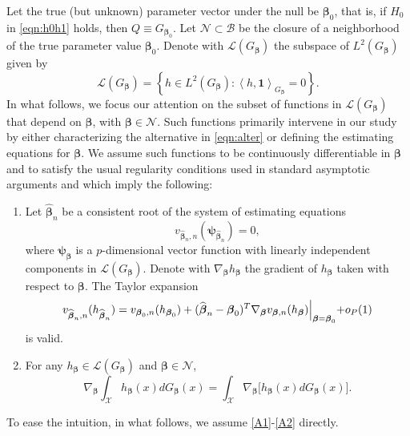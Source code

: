\documentclass[11pt]{article}
\newcommand{\vect}[1]{\boldsymbol{#1}}
\newcommand{\inner}[1]{\left\langle #1 \right\rangle}
\begin{document}
Let the true (but unknown) parameter vector under the null be $\vect{\beta}_0$, that is, if
$H_0$ in \eqref{eqn:h0h1} holds, then $Q\equiv G_{\vect{\beta}_0}$. Let $\mathcal{N}\subset\mathcal{B}$ be the closure of a neighborhood of the true parameter value $\vect{\beta}_0$.  Denote with $\mathcal{L}\left(G_{\vect{\beta}}\right)$ the subspace of $L^2\left(G_{\vect{\beta}}\right)$ given by
$$\mathcal{L}\left(G_{\vect{\beta}}\right)=\left\{ h \in L^2\left(G_{\vect{\beta}}\right): \inner{h,\bm{1}}_{G_{\vect{\beta}}}=0\right\}.$$ 
In what follows, we focus our attention on the subset of functions in $\mathcal{L}\left(G_{\vect{\beta}}\right)$ that depend on $\vect{\beta}$, with $\vect{\beta}\in\mathcal{N}$. Such functions primarily intervene in our study by either characterizing the alternative in \eqref{eqn:alter} or defining the estimating equations for $\vect{\beta}$. 
We assume such functions to be continuously differentiable in $\vect{\beta}$ and to satisfy the usual regularity conditions used in standard asymptotic arguments \citep[cf.][Ch.5]{van2000asymptotic} and which imply the following:
\begin{enumerate} [label=(A\arabic*)]
\item \label{A1} Let $\widehat{\vect{\beta}}_n$ be a consistent root of the system of estimating equations
 \begin{equation}
 \label{ref:estimation}
 v_{\widehat{\vect{\beta}}_n,n}( \vect{\psi}_{\widehat{\vect{\beta}}_n})=0,
 \end{equation}
where $\vect{\psi}_{\vect{\beta}}$ is a $p$-dimensional vector function with linearly independent components in $\mathcal{L}\left(G_{\vect{\beta}}\right)$. 
Denote with $\nabla_{\vect{\beta}}h_{\vect{\beta}}$ the gradient of  $h_{\vect{\beta}}$ taken with respect to $\vect{\beta}$. The Taylor expansion
\begin{equation}\label{eqn:Taylor}
v_{\widehat{\vect{\beta}}_n,n}(h_{\widehat{\vect{\beta}}_n}) = v_{\vect{\beta}_0,n}(h_{\vect{\beta}_0}) +  (\widehat{\vect{\beta}}_n- \vect{\beta}_0)^T \nabla_{\vect{\beta}} v_{\vect{\beta},n}(h_{\vect{\beta}})\Bigl|_{\vect{\beta}=\vect{\beta}_0}
+o_P(1)
\end{equation}
is valid.
\item \label{A2}  For any $h_{\vect{\beta}} \in \mathcal{L}\left(G_{\vect{\beta}}\right)$ and $\vect{\beta} \in \mathcal{N}$, 
$$\nabla_{\vect{\beta}} \int_{\mathcal{X}}  h_{\vect{\beta}}(x)dG_{\vect{\beta}}(x)=\int_{\mathcal{X}} \nabla_{\vect{\beta}} \Big[ h_{\vect{\beta}}(x)dG_{\vect{\beta}}(x)\Big].$$
\end{enumerate}
To ease the intuition, in what follows, we assume \ref{A1}-\ref{A2} directly.  
\end{document}
